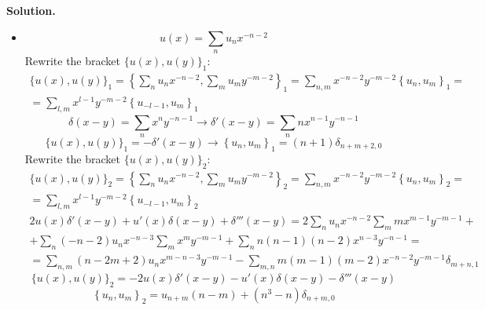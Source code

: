 \documentclass[12pt]{article}
\theoremstyle{definition}
\begin{document}
\begin{enumerate}
\begin{itemize}
\begin{equation}
        \end{equation}
    \end{itemize}
    \textbf{Solution.}
    \begin{itemize}
        \item
        \begin{equation}
            u(x) = \sum\limits_nu_nx^{-n-2}
        \end{equation}
        Rewrite the bracket $\{u(x),u(y)\}_1$:
        \begin{multline}
            \{u(x),u(y)\}_1=\left\{\sum_n u_n x^{-n-2},\sum_mu_my^{-m-2}\right\}_1=\sum_{n,m} x^{-n-2}y^{-m-2} \left\{u_n,u_m\right\}_1=\\=\sum_{l,m}x^{l-1}y^{-m-2}\left\{u_{-l-1},u_m\right\}_1
        \end{multline}
        \begin{equation}
            \delta(x-y)=\sum\limits_nx^ny^{-n-1}\rightarrow\delta'(x-y)=\sum\limits_nnx^{n-1}y^{-n-1}
        \end{equation}
        \begin{equation}
            \{u(x),u(y)\}_1=-\delta'(x-y)\rightarrow\boxed{\left\{u_{n} , u_m \right\}_1=(n+1) \delta_{n+m+2,0}}
        \end{equation}
        Rewrite the bracket $\{u(x),u(y)\}_2$:
        \begin{multline}
            \{u(x),u(y)\}_2=\left\{\sum_n u_n x^{-n-2},\sum_m u_m y^{-m-2}\right\}_2=\sum_{n,m} x^{-n-2}y^{-m-2}\left\{u_n,u_m\right\}_2=\\=\sum_{l,m}x^{l-1}y^{-m-2}\left\{u_{-l-1},u_m\right\}_2
        \end{multline}
        \begin{multline}
            2u(x)\delta'(x-y)+u'(x)\delta(x-y)+\delta'''(x-y)=2\sum_nu_nx^{-n-2}\sum_m mx^{m-1}y^{-m-1}+\\+\sum_n(-n-2)u_nx^{-n-3}\sum_mx^{m}y^{-m-1}+\sum_nn(n-1)(n-2)x^{n-3}y^{-n-1}=\\=\sum_{n,m}(n-2m+2)u_nx^{m-n-3}y^{-m-1}-\sum_{m,n}m(m-1)(m-2)x^{-n-2}y^{-m-1}\delta_{m+n,1}
        \end{multline}
        \begin{equation}
            \{u(x),u(y)\}_2=-2u(x)\delta'(x-y)-u'(x)\delta(x-y)-\delta'''(x-y)
        \end{equation}
        \begin{equation}
            \boxed{\left\{u_n,u_m\right\}_2=u_{n+m}(n-m)+(n^3-n)\delta_{n+m,0}}
        \end{equation}

\end{itemize}
\end{enumerate}
\end{document}
